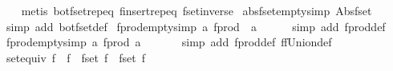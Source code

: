 \begin{isabellebody}
%
\isadelimproof
\ \ %
\endisadelimproof
%
\isatagproof
{}\isamarkupfalse%
\ {\isacharparenleft}metis\ bot{\isacharunderscore}fset{\isachardot}rep{\isacharunderscore}eq\ finsert{\isachardot}rep{\isacharunderscore}eq\ fset{\isacharunderscore}inverse{\isacharparenright}%
\endisatagproof
{\isafoldproof}%
%
\isadelimproof
\isanewline
%
\endisadelimproof
\isanewline
{}\isamarkupfalse%
\ abs{\isacharunderscore}fset{\isacharunderscore}empty{\isacharbrackleft}simp{\isacharbrackright}{\isacharcolon}\ {\isachardoublequoteopen}Abs{\isacharunderscore}fset\ {\isacharbraceleft}{\isacharbraceright}\ {\isacharequal}\ {\isacharbraceleft}{\isacharbar}{\isacharbar}{\isacharbraceright}{\isachardoublequoteclose}\isanewline
%
\isadelimproof
\ \ %
\endisadelimproof
%
\isatagproof
{}\isamarkupfalse%
\ {\isacharparenleft}simp\ add{\isacharcolon}\ bot{\isacharunderscore}fset{\isacharunderscore}def{\isacharparenright}%
\endisatagproof
{\isafoldproof}%
%
\isadelimproof
\isanewline
%
\endisadelimproof
\isanewline
{}\isamarkupfalse%
\ fprod{\isacharunderscore}empty{\isacharbrackleft}simp{\isacharbrackright}{\isacharcolon}\ {\isachardoublequoteopen}{\isasymforall}a{\isachardot}\ fprod\ {\isacharbraceleft}{\isacharbar}{\isacharbar}{\isacharbraceright}\ a\ {\isacharequal}\ {\isacharbraceleft}{\isacharbar}{\isacharbar}{\isacharbraceright}{\isachardoublequoteclose}\isanewline
%
\isadelimproof
\ \ %
\endisadelimproof
%
\isatagproof
{}\isamarkupfalse%
\ {\isacharparenleft}simp\ add{\isacharcolon}\ fprod{\isacharunderscore}def{\isacharparenright}%
\endisatagproof
{\isafoldproof}%
%
\isadelimproof
\isanewline
%
\endisadelimproof
\isanewline
{}\isamarkupfalse%
\ fprod{\isacharunderscore}empty{\isacharunderscore}{}{\isacharbrackleft}simp{\isacharbrackright}{\isacharcolon}\ {\isachardoublequoteopen}{\isasymforall}a{\isachardot}\ fprod\ a\ {\isacharbraceleft}{\isacharbar}{\isacharbar}{\isacharbraceright}\ {\isacharequal}\ {\isacharbraceleft}{\isacharbar}{\isacharbar}{\isacharbraceright}{\isachardoublequoteclose}\isanewline
%
\isadelimproof
\ \ %
\endisadelimproof
%
\isatagproof
{}\isamarkupfalse%
\ {\isacharparenleft}simp\ add{\isacharcolon}\ fprod{\isacharunderscore}def\ ffUnion{\isacharunderscore}def{\isacharparenright}%
\endisatagproof
{\isafoldproof}%
%
\isadelimproof
\isanewline
%
\endisadelimproof
\isanewline
{}\isamarkupfalse%
\ set{\isacharunderscore}equiv{\isacharcolon}\ {\isachardoublequoteopen}{\isacharparenleft}f{}\ {\isacharequal}\ f{}{\isacharparenright}\ {\isacharequal}\ {\isacharparenleft}fset\ f{}\ {\isacharequal}\ fset\ f{}{\isacharparenright}{\isachardoublequoteclose}\isanewline

\end{isabellebody}
